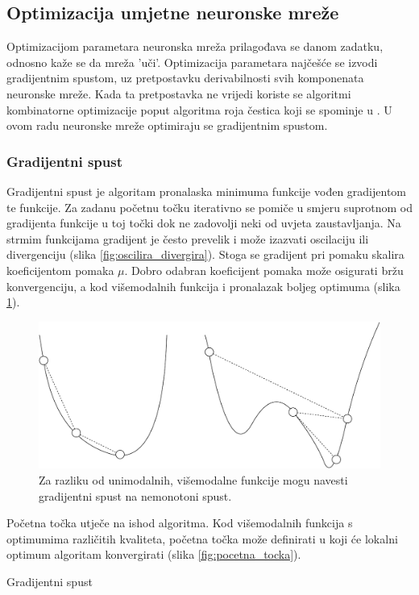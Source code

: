 \documentclass[times, utf8, numeric, diplomski]{fer}
\def\figref#1{(slika \ref{#1})}
\begin{document}
\subsection{Optimizacija umjetne neuronske mreže}
Optimizacijom parametara neuronska mreža prilagođava se danom zadatku, odnosno kaže se da mreža 'uči'. Optimizacija parametara najčešće se izvodi gradijentnim spustom, uz pretpostavku derivabilnosti svih komponenata neuronske mreže. Kada ta pretpostavka ne vrijedi koriste se algoritmi kombinatorne optimizacije poput algoritma roja čestica koji se spominje u \citet{skripta_nenr}. U ovom radu neuronske mreže optimiraju se gradijentnim spustom.

\subsubsection{Gradijentni spust}
\label{sec:gradijentni_spust}
Gradijentni spust je algoritam pronalaska minimuma funkcije vođen gradijentom te funkcije. Za zadanu početnu točku iterativno se pomiče u smjeru suprotnom od gradijenta funkcije u toj točki dok ne zadovolji neki od uvjeta zaustavljanja. Na strmim funkcijama gradijent je često prevelik i može izazvati oscilaciju ili divergenciju \figref{fig:oscilira_divergira}. Stoga se gradijent pri pomaku skalira koeficijentom pomaka $\mu$. Dobro odabran koeficijent pomaka može osigurati bržu konvergenciju, a kod višemodalnih funkcija i pronalazak boljeg optimuma \figref{fig:gradientni_spust}.

\begin{figure}[H]
\centering
\includegraphics[scale=0.45]{grad_descent_modality.pdf}
\caption{Za razliku od unimodalnih, višemodalne funkcije mogu navesti gradijentni spust na nemonotoni spust.}
\label{fig:gradientni_spust}
\end{figure}

Početna točka utječe na ishod algoritma. Kod višemodalnih funkcija s optimumima različitih kvaliteta, početna točka može definirati u koji će lokalni optimum algoritam konvergirati \figref{fig:pocetna_tocka}.
\newline
\newline
\begin{algorithm}[H]
\DontPrintSemicolon
{}
\;
\caption{Gradijentni spust}
\label{alg:grad_spust}
\end{algorithm}
\end{document}
